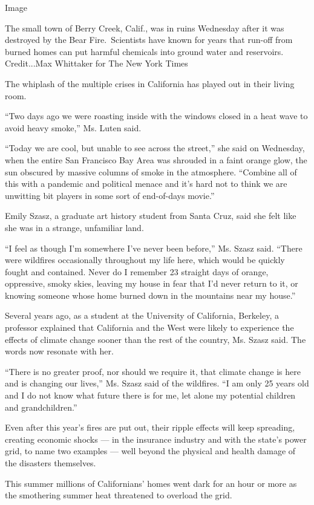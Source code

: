 Image

The small town of Berry Creek, Calif., was in ruins Wednesday after it
was destroyed by the Bear Fire.~Scientists have known for years that
run-off from burned homes can put harmful chemicals into ground water
and reservoirs. Credit...Max Whittaker for The New York Times

The whiplash of the multiple crises in California has played out in
their living room.

``Two days ago we were roasting inside with the windows closed in a heat
wave to avoid heavy smoke,'' Ms. Luten said.

``Today we are cool, but unable to see across the street,'' she said on
Wednesday, when the entire San Francisco Bay Area was shrouded in a
faint orange glow, the sun obscured by massive columns of smoke in the
atmosphere. ``Combine all of this with a pandemic and political menace
and it's hard not to think we are unwitting bit players in some sort of
end-of-days movie.''

Emily Szasz, a graduate art history student from Santa Cruz, said she
felt like she was in a strange, unfamiliar land.

``I feel as though I'm somewhere I've never been before,'' Ms. Szasz
said. ``There were wildfires occasionally throughout my life here, which
would be quickly fought and contained. Never do I remember 23 straight
days of orange, oppressive, smoky skies, leaving my house in fear that
I'd never return to it, or knowing someone whose home burned down in the
mountains near my house.''

Several years ago, as a student at the University of California,
Berkeley, a professor explained that California and the West were likely
to experience the effects of climate change sooner than the rest of the
country, Ms. Szasz said. The words now resonate with her.

``There is no greater proof, nor should we require it, that climate
change is here and is changing our lives,'' Ms. Szasz said of the
wildfires. ``I am only 25 years old and I do not know what future there
is for me, let alone my potential children and grandchildren.''

Even after this year's fires are put out, their ripple effects will keep
spreading, creating economic shocks --- in the insurance industry and
with the state's power grid, to name two examples --- well beyond the
physical and health damage of the disasters themselves.

This summer millions of Californians' homes went dark for an hour or
more as the smothering summer heat threatened to overload the grid.

